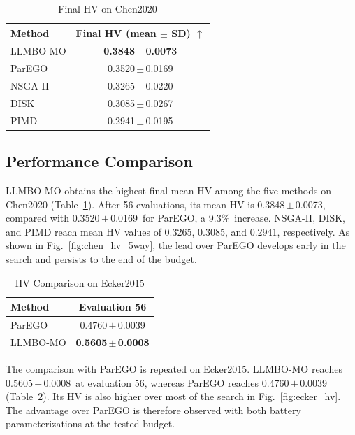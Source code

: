 \documentclass[lettersize,journal]{IEEEtran}
\newcommand{\ChenLLMBOMean}{0.3848}
\newcommand{\ChenLLMBOStd}{0.0073}
\newcommand{\ChenParEGOMean}{0.3520}
\newcommand{\ChenParEGOStd}{0.0169}
\newcommand{\ChenFinalGain}{9.3\%}
\newcommand{\ChenNSGAMean}{0.3265}
\newcommand{\ChenNSGAStd}{0.0220}
\newcommand{\ChenDISKMean}{0.3085}
\newcommand{\ChenDISKStd}{0.0267}
\newcommand{\ChenPIMDMean}{0.2941}
\newcommand{\ChenPIMDStd}{0.0195}
\newcommand{\EckerParEGOMean}{0.4760}
\newcommand{\EckerParEGOStd}{0.0039}
\newcommand{\EckerLLMBOMean}{0.5605}
\newcommand{\EckerLLMBOStd}{0.0008}
\begin{document}
\begin{table}[!t]
\caption{Final HV on Chen2020}
\label{tab:chen_results}
\centering
\footnotesize
\setlength{\tabcolsep}{4.0pt}
\begin{tabular}{@{}lc@{}}
\toprule
Method & Final HV (mean $\pm$ SD) $\uparrow$ \\
\midrule
LLMBO-MO & \textbf{\ChenLLMBOMean\,$\pm$\,\ChenLLMBOStd} \\
ParEGO & \ChenParEGOMean\,$\pm$\,\ChenParEGOStd \\
NSGA-II & \ChenNSGAMean\,$\pm$\,\ChenNSGAStd \\
DISK & \ChenDISKMean\,$\pm$\,\ChenDISKStd \\
PIMD & \ChenPIMDMean\,$\pm$\,\ChenPIMDStd \\
\bottomrule
\end{tabular}
\end{table}

\subsection{Performance Comparison}

LLMBO-MO obtains the highest final mean HV among the five methods on Chen2020
(Table~\ref{tab:chen_results}). After 56 evaluations, its mean HV is
\ChenLLMBOMean\,$\pm$\,\ChenLLMBOStd, compared with
\ChenParEGOMean\,$\pm$\,\ChenParEGOStd\ for ParEGO, a
\ChenFinalGain\ increase. NSGA-II, DISK, and PIMD reach mean HV values of
\ChenNSGAMean, \ChenDISKMean, and \ChenPIMDMean, respectively.
As shown in Fig.~\ref{fig:chen_hv_5way}, the lead over ParEGO develops early
in the search and persists to the end of the budget.

\begin{table}[!t]
\caption{HV Comparison on Ecker2015}
\label{tab:ecker_results}
\centering
\footnotesize
\setlength{\tabcolsep}{4.0pt}
\begin{tabular}{@{}lc@{}}
\toprule
Method & Evaluation 56 \\
\midrule
ParEGO & \EckerParEGOMean\,$\pm$\,\EckerParEGOStd \\
LLMBO-MO & \textbf{\EckerLLMBOMean\,$\pm$\,\EckerLLMBOStd} \\
\bottomrule
\end{tabular}
\end{table}

The comparison with ParEGO is repeated on Ecker2015. LLMBO-MO reaches
\EckerLLMBOMean\,$\pm$\,\EckerLLMBOStd\ at evaluation 56, whereas ParEGO
reaches \EckerParEGOMean\,$\pm$\,\EckerParEGOStd
(Table~\ref{tab:ecker_results}). Its HV is also higher over most of the search
in Fig.~\ref{fig:ecker_hv}. The advantage over ParEGO is therefore observed
with both battery parameterizations at the tested budget.
\end{document}

